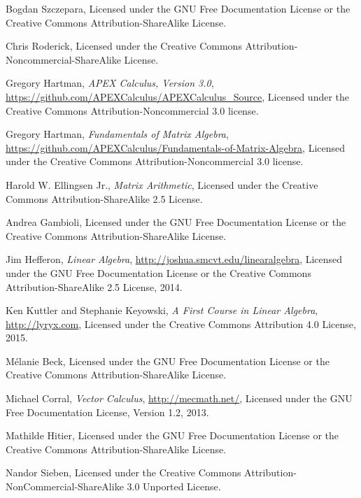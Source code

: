 \onecolumn


\begin{thebibliography}{9}
\label{label:authors}
Bogdan Szczepara,
Licensed under the GNU Free Documentation License or the
Creative Commons Attribution-ShareAlike License.

Chris Roderick,
Licensed under the
Creative Commons Attribution-Noncommercial-ShareAlike License.

Gregory Hartman,
\emph{APEX Calculus, Version 3.0},
\url{https://github.com/APEXCalculus/APEXCalculus_Source},
Licensed under the
Creative Commons Attribution-Noncommercial 3.0 license.

Gregory Hartman,
\emph{Fundamentals of Matrix Algebra},
\url{https://github.com/APEXCalculus/Fundamentals-of-Matrix-Algebra},
Licensed under the 
Creative Commons Attribution-Noncommercial 3.0 license.

Harold W. Ellingsen Jr.,
\emph{Matrix Arithmetic},
Licensed under the
Creative Commons Attribution-ShareAlike 2.5 License.

Andrea Gambioli,
Licensed under the GNU Free Documentation License or the
Creative Commons Attribution-ShareAlike License.


Jim Hefferon,
\emph{Linear Algebra},
\url{http://joshua.smcvt.edu/linearalgebra},
Licensed under the GNU Free Documentation License or the 
Creative Commons Attribution-ShareAlike 2.5 License,
2014.

Ken Kuttler and Stephanie Keyowski,
\emph{A First Course in Linear Algebra},
\url{http://lyryx.com},
Licensed under the
Creative Commons Attribution 4.0 License,
2015.

M\'elanie Beck,
Licensed under the GNU Free Documentation License or the
Creative Commons Attribution-ShareAlike License.

Michael Corral,
\emph{Vector Calculus},
\url{http://mecmath.net/},
Licensed under the GNU Free Documentation License, Version 1.2, 2013.

Mathilde Hitier,
Licensed under the GNU Free Documentation License or the
Creative Commons Attribution-ShareAlike License.

Nandor Sieben,
Licensed under the Creative Commons Attribution-NonCommercial-ShareAlike 3.0 Unported License. 


\end{thebibliography}
